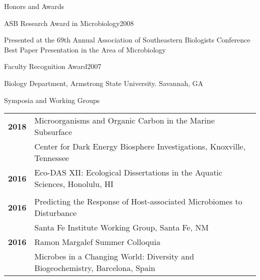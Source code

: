 \documentclass{resume} %
\begin{document}
\begin{rSection}{Honors and Awards}
    \begin{rSubsection}{ASB Research Award in Microbiology}{2008}{}{}
      \item Presented at the 69th Annual Association of Southeastern Biologists
      Conference \\
      Best Paper Presentation in the Area of Microbiology
    \end{rSubsection}

    \begin{rSubsection}{Faculty Recognition Award}{2007}{}{}
      \item Biology Department, Armstrong State University. Savannah, GA
    \end{rSubsection}

\end{rSection}


\begin{rSection}{Symposia and Working Groups}

  \begin{tabular}{ @{} >{\bfseries}l @{\hspace{6ex}} l }
  2018	& Microorganisms and Organic Carbon in the Marine Subsurface \\
  		& Center for Dark Energy Biosphere Investigations, Knoxville, Tennessee \\
  2016  	& Eco-DAS XII: Ecological Dissertations in the Aquatic Sciences, Honolulu, HI  \\
  \\
  2016 	& Predicting the Response of Host-associated Microbiomes to Disturbance \\
       		&  Santa Fe Institute Working Group, Santa Fe, NM \\
  2016 	& Ramon Margalef Summer Colloquia \\
       		& Microbes in a Changing World: Diversity and Biogeochemistry, Barcelona, Spain \\
  \end{tabular}

\end{rSection}


\end{document}
